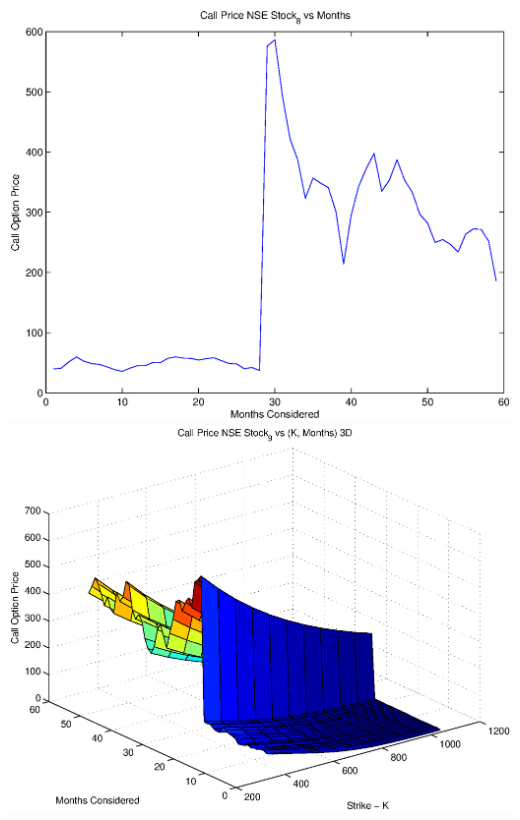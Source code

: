 \documentclass{article}
\begin{document}
\includegraphics[width=\textwidth]{Call_Price_NSE_Stock_8_vs_Months} \\

\includegraphics[width=\textwidth]{Call_Price_NSE_Stock_9_vs_(K,_Months)_3D} \\
\end{document}
